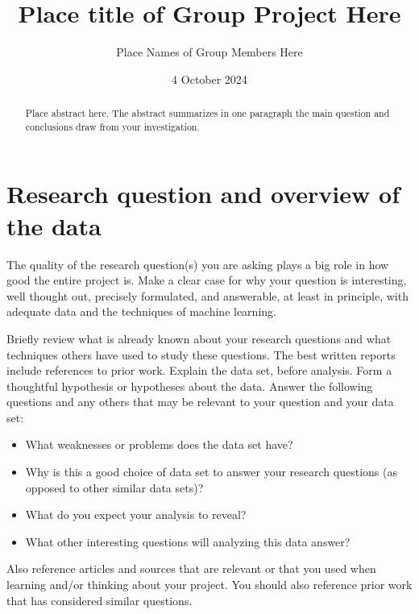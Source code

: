 \documentclass[11pt]{amsart}
\begin{document}
\title{Place title of Group Project Here}
\author{Place Names of Group Members Here}

\date{4 October 2024} %

\maketitle %

\begin{abstract}
Place abstract here. The abstract summarizes in one paragraph the main question and conclusions draw from your investigation.
\end{abstract}

\section{Research question and overview of the data }

 The quality of the research question(s) you are asking plays a big role in how good the entire project is. Make a clear case for why your question is interesting, well thought out, precisely formulated, and answerable, at least in principle, with adequate data and the techniques of machine learning.

    Briefly review what is already known about your research questions and what techniques others have used to study these questions. The best written reports include references to prior work.
    Explain the data set, before analysis. Form a thoughtful hypothesis or hypotheses about the data. Answer the following questions and any others that may be relevant to your question and your data set:
    \begin{itemize}
        \item What weaknesses or problems does the data set have?
        \item Why is this a good choice of data set to answer your research questions (as opposed to other similar data sets)?
        \item What do you expect your analysis to reveal?
        \item What other interesting questions will analyzing this data answer?
        \end{itemize}


Also reference articles and sources \cite{Vandermeersch} that are relevant or that you used when learning and/or thinking about your project. You should also reference prior work that has considered similar questions.
\end{document}
